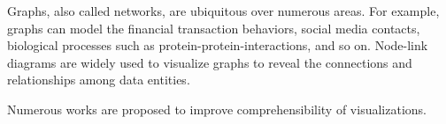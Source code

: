 \maketitle

Graphs, also called networks, are ubiquitous over numerous areas. For example, graphs can model the financial transaction behaviors, social media contacts, biological processes such as protein-protein-interactions, and so on.
Node-link diagrams are widely used to visualize graphs to reveal the connections and relationships among data entities.

Numerous works are proposed to improve comprehensibility of visualizations.




